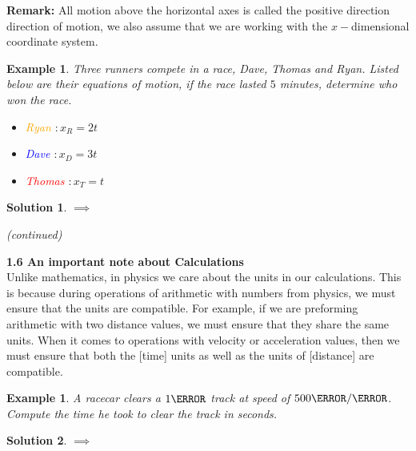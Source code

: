 \documentclass[12pt]{article}
\theoremstyle{break}
\newtheorem{ex}[thm]{Example}
\newtheorem*{soln}{Solution}
\begin{document}
\textbf{Remark: }All motion above the horizontal axes is called the positive direction direction of motion, we also assume that we are working with the $x-$dimensional coordinate system.
\begin{ex} 
	Three runners compete in a race, Dave, Thomas and Ryan. Listed below are their equations of motion, if the race lasted $5$ minutes, determine who won the race.
	\begin{itemize}
		\item \textcolor{orange}{Ryan} $\colon x_R = 2t$
		\item \textcolor{blue}{Dave} $\colon x_D = 3t$
		\item \textcolor{red}{Thomas} $\colon x_T = t$
	\end{itemize}
\end{ex}
\begin{soln}
	$\implies$
	\begin{center}
		\end{center}
		(continued)
\vspace*{15cm}
\end{soln}
\textbf{\large{1.6 An important note about Calculations}}\\
Unlike mathematics, in physics we care about the units in our calculations. This is because during operations of arithmetic with numbers from physics, we must ensure that the units are compatible. For example, if we are preforming arithmetic with two distance values, we must ensure that they share the same units. When it comes to operations with velocity or acceleration values, then we must ensure that both the [time] units as well as the units of [distance] are compatible.
\newpage 
\begin{ex}
	A racecar clears a $1\km$ track at speed of $500 \m / \s$. Compute the time he took to clear the track in seconds. 
\end{ex}
\begin{soln}
$\implies$
\vspace*{4cm}
\end{soln}
\end{document}
